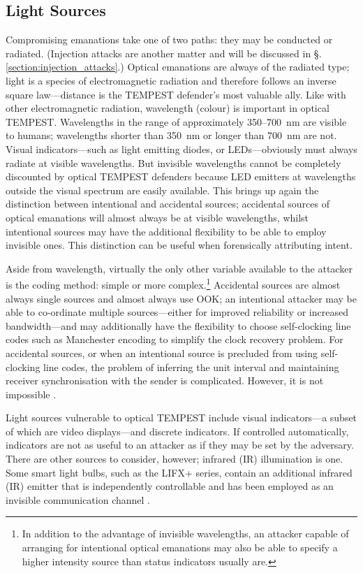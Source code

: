 \documentclass[a4paper,twoside,11pt]{book}
\begin{document}
\subsection{Light Sources}
Compromising emanations take one of two paths: they may be conducted or
radiated. (Injection attacks are another matter and will be discussed in
\S \thechapter.\ref{section:injection_attacks}.) Optical emanations are always
of the radiated type; light is a species of electromagnetic radiation and
therefore follows an inverse square law---distance is the TEMPEST defender's
most valuable ally. Like with other electromagnetic radiation, wavelength
(colour) is important in optical TEMPEST. Wavelengths in the range of
approximately 350--\SI{700}{\nano\metre} are visible to
humans; wavelengths shorter than \SI{350}{\nano\metre} or longer than
\SI{700}{\nano\metre} are not. Visual indicators---such as light emitting
diodes, or LEDs---obviously must always radiate at visible wavelengths. But
invisible wavelengths cannot be completely discounted by optical TEMPEST
defenders because LED emitters at wavelengths outside the visual spectrum are
easily available. This brings up again the distinction between intentional and
accidental sources; accidental sources of optical emanations will almost always
be at visible wavelengths, whilst intentional sources may have the additional
flexibility to be able to employ invisible ones. This distinction can be useful
when forensically attributing intent.

Aside from wavelength, virtually the only other variable available to the
attacker is the coding method: simple or more complex.\footnote{In addition to
the advantage of invisible wavelengths, an attacker capable of arranging for
intentional optical emanations may also be able to specify a higher intensity
source than status indicators usually are.} Accidental sources are almost
always single sources and almost always use OOK; an intentional attacker may be
able to co-ordinate multiple sources---either for improved reliability or
increased bandwidth---and may additionally have the flexibility to choose
self-clocking line codes such as Manchester encoding to simplify the clock
recovery problem. For accidental sources, or when an intentional source is
precluded from using self-clocking line codes, the problem of inferring the
unit interval and maintaining receiver synchronisation with the sender is
complicated. However, it is not impossible \cite[\S 8.2]{Loughry2002a}.

Light sources vulnerable to optical TEMPEST include visual indicators---a
subset of which are video displays---and discrete indicators. If controlled
automatically, indicators are not as useful to an attacker as if they may be
set by the adversary. There are other sources to consider, however; infrared
(IR) illumination is one. Some smart light bulbs, such as the LIFX+ series,
contain an additional infrared (IR) emitter that is independently controllable
and has been employed as an invisible communication channel \cite{Maiti2018b}.
\end{document}
